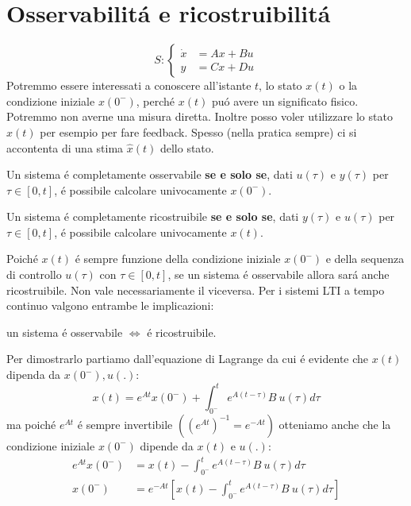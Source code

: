 \documentclass[../main.tex]{subfiles}
\begin{document}
	\section{Osservabilit\'a e ricostruibilit\'a}
		\[
			S:
			\begin{cases}
				\dot x &= Ax + Bu\\
				y &= Cx + Du
			\end{cases}
		\]
		Potremmo essere interessati a conoscere all'istante $ t $, lo stato $ x(t) $ o la condizione iniziale $ x(0^{-}) $, perch\'e $ x(t) $ pu\'o avere un significato fisico. Potremmo non averne una misura diretta. Inoltre posso voler utilizzare lo stato $ x(t) $ per esempio per fare feedback. Spesso (nella pratica sempre) ci si accontenta di una stima $ \hat x(t) $ dello stato.
		
		\begin{definition}
			Un sistema \'e completamente osservabile \textbf{se e solo se}, dati $ u(\tau) $ e $ y(\tau) $ per $ \tau \in [0,t] $, \'e possibile calcolare univocamente $ x(0^{-}) $.
		\end{definition}
	
		\begin{definition}
			Un sistema \'e completamente ricostruibile \textbf{se e solo se}, dati $ y(\tau) $ e $ u(\tau) $ per $ \tau \in [0,t] $, \'e possibile calcolare univocamente $ x(t) $.
		\end{definition}
	
		Poich\'e $ x(t) $ \'e sempre funzione della condizione iniziale $ x(0^{-}) $ e della sequenza di controllo $ u(\tau) $ con $ \tau \in [0,t] $, se un sistema \'e osservabile allora sar\'a anche ricostruibile. Non vale necessariamente il viceversa. Per i sistemi LTI a tempo continuo valgono entrambe le implicazioni:
		\begin{center}
			un sistema \'e osservabile $ \Leftrightarrow $ \'e ricostruibile.
		\end{center}
		Per dimostrarlo partiamo dall'equazione di Lagrange da cui \'e evidente che $ x(t) $ dipenda da $ x(0^{-}), u(.) $:
		\[
			x(t) = e^{At}x(0^{-}) + \int_{0^{-}}^{t} e^{A(t-\tau)} B\ u(\tau) d\tau
		\]
		ma poich\'e $ e^{At} $ \'e sempre invertibile $ \left( (e^{At})^{-1} = e^{-At} \right) $ otteniamo anche che la condizione iniziale $ x(0^{-}) $ dipende da $ x(t) $ e $ u(.) $:
		\begin{align*}
			e^{At} x(0^{-}) &= x(t) - \int_{0^{-}}^{t} e^{A(t-\tau)} B\ u(\tau) d\tau\\
			x(0^{-}) &= e^{-At} \left[ x(t) - \int_{0^{-}}^{t} e^{A(t-\tau)} B\ u(\tau) d\tau \right] 
		\end{align*}
		
\end{document}
